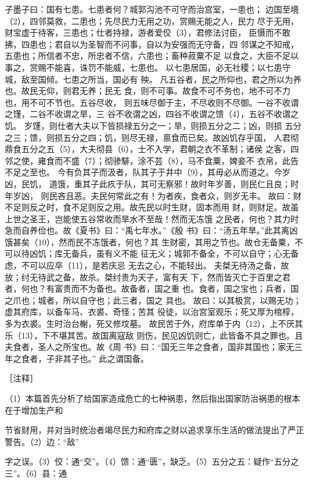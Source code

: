 \documentclass[12pt,UTF8]{ctexbook}
\begin{document}
子墨子曰：国有七患。七患者何？城郭沟池不可守而治宫室，一患也； 
边国至境（2），四邻莫救，二患也；先尽民力无用之功，赏赐无能之人，民力 
尽于无用，财宝虚于待客，三患也；仕者持禄，游者爱佼（3），君修法讨臣， 
臣慑而不敢拂，四患也；君自以为圣智而不问事，自以为安强而无守备，四 
邻谋之不知戒，五患也；所信者不忠，所忠者不信，六患也；畜种菽粟不足 
以食之，大臣不足以事之，赏赐不能喜，诛罚不能威，七患也。 
以七患居国，必无社稷；以七患守城，敌至国倾。七患之所当，国必有 
殃。 
凡五谷者，民之所仰也，君之所以为养也。故民无仰，则君无养；民无 
食，则不可事。故食不可不务也，地不可不力也，用不可不节也。五谷尽收， 
则五味尽御于主，不尽收则不尽御。一谷不收谓之馑，二谷不收谓之旱，三 
谷不收谓之凶，四谷不收谓之馈（4），五谷不收谓之饥。 
岁馑，则仕者大夫以下皆损禄五分之一；旱，则损五分之二；凶，则损 
五分之三；馈，则损五分之四；饥，则尽无禄，禀食而已矣。故凶饥存乎国， 
人君彻鼎食五分之五（5），大夫彻县（6），士不入学，君朝之衣不革制；诸侯 
之客，四邻之使，雍食而不盛（7）；彻骖騑，涂不芸（8），马不食粟，婢妾不 
衣帛，此告不足之至也。 
今有负其子而汲者，队其子于井中（9），其毋必从而道之。今岁凶，民饥， 
道饿，重其子此疚于队，其可无察邪！故时年岁善，则民仁且良；时年岁凶， 
则民吝且恶。夫民何常此之有！为者疾，食者众，则岁无丰。 
故曰：财不足则反之时，食不足则反之用。故先民以时生财，固本而用 
财，则财足。故虽上世之圣王，岂能使五谷常收而旱水不至哉！然而无冻饿 
之民者，何也？其力时急而自养俭也。故《夏书》曰：“禹七年水。”《殷 
书》曰：“汤五年旱。”此其离凶饿甚矣（10），然而民不冻饿者，何也？其 
生财密，其用之节也。故仓无备粟，不可以待凶饥；库无备兵，虽有义不能 
征无义；城郭不备全，不可以自守；心无备虑，不可以应卒（11），是若庆忌 
无去之心，不能轻出。 
夫桀无待汤之备，故放；纣无待武之备，故杀。桀纣贵为天子，富有天 
下，然而皆灭亡于百里之君者，何也？有富贵而不为备也。故备者，国之重 
也。食者，国之宝也；兵者，国之爪也；城者，所以自守也；此三者，国之 
具也。 
故曰：以其极赏，以赐无功；虚其府库，以备车马、衣裘、奇怪；苦其 
役徒，以治宫室观乐；死又厚为棺椁，多为衣裘。生时治台榭，死又修坟墓。 
故民苦于外，府库单于内（12），上不厌其乐（13），下不堪其苦。故国离寇敌 
则伤，民见凶饥则亡，此皆备不具之罪也。且夫食者，圣人之所宝也。故《周 
书》曰：“国无三年之食者，国非其国也；家无三年之食者，子非其子也。” 
此之谓国备。 


［注释］ 

（1）本篇首先分析了给国家造成危亡的七种祸患，然后指出国家防治祸患的根本在于增加生产和 

节省财用，并对当时统治者竭尽民力和府库之财以追求享乐生活的做法提出了严正警告。（2）边：“敌” 

字之误。（3）佼：通“交”。（4）馈：通“匮”，缺乏。（5）五分之五：疑作“五分之三”。（6）县：通 
\end{document}
